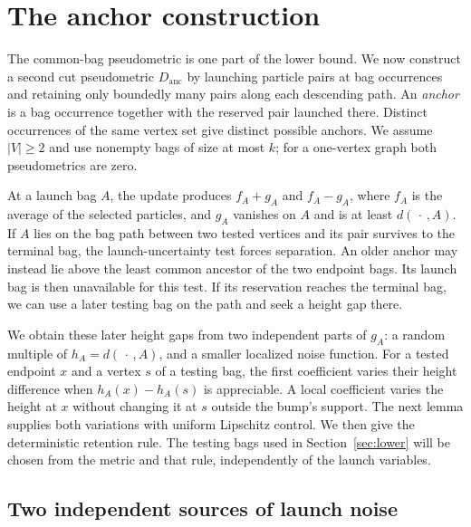 \section{The anchor construction}\label{sec:anchors}

The common-bag pseudometric is one part of the lower bound. We now
construct a second cut pseudometric $D_{\mathrm{anc}}$ by launching
particle pairs at bag occurrences and retaining only boundedly many
pairs along each descending path. An \emph{anchor} is a bag occurrence
together with the reserved pair launched there. Distinct occurrences of
the same vertex set give distinct possible anchors. We assume $|V|\geq2$
and use nonempty bags of size at most $k$; for a one-vertex graph both
pseudometrics are zero.

At a launch bag $A$, the update produces $f_A+g_A$ and $f_A-g_A$,
where $f_A$ is the average of the selected particles, and $g_A$
vanishes on $A$ and is at least $d(\,\cdot\,,A)$.
If $A$ lies on the bag path between two tested vertices and its pair
survives to the terminal bag, the launch-uncertainty test forces
separation. An older anchor may instead lie above the least common ancestor
of the two endpoint bags. Its launch bag is then unavailable for this test. If its
reservation reaches the terminal bag, we can use a later testing bag
on the path and seek a height gap there.

We obtain these later height gaps from two independent parts of $g_A$:
a random multiple of $h_A=d(\,\cdot\,,A)$, and a smaller localized
noise function. For a tested endpoint $x$ and a vertex $s$ of a testing
bag, the first coefficient varies their height difference when
$h_A(x)-h_A(s)$ is appreciable. A local coefficient varies the height
at $x$ without changing it at $s$ outside the bump's support. The next
lemma supplies both variations with uniform Lipschitz control. We then
give the deterministic retention rule. The testing bags used in
Section~\ref{sec:lower} will be chosen from the metric and that rule,
independently of the launch variables.

\subsection{Two independent sources of launch noise}

